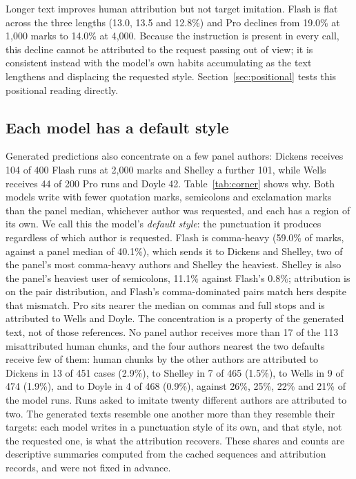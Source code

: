 \documentclass[11pt]{article}
\begin{document}
Longer text improves human attribution but not target imitation.  Flash
is flat across the three lengths (13.0, 13.5 and 12.8\%) and Pro declines
from 19.0\% at 1,000 marks to 14.0\% at 4,000.  Because the instruction
is present in every call, this decline cannot be attributed to the
request passing out of view; it is consistent instead with the model's
own habits accumulating as the text lengthens and displacing the
requested style.  Section~\ref{sec:positional} tests this positional
reading directly.

\subsection{Each model has a default style}

Generated predictions also concentrate on a few panel authors: Dickens
receives 104 of 400 Flash runs at 2,000 marks and Shelley a further 101,
while Wells receives 44 of 200 Pro runs and Doyle 42.
Table~\ref{tab:corner} shows why.  Both models write with fewer
quotation marks, semicolons and exclamation marks than the panel median,
whichever author was requested, and each has a region of its own.  We
call this the model's \emph{default style}: the punctuation it produces
regardless of which author is requested.  
Flash is comma-heavy (59.0\% of marks, against a panel median of
40.1\%), which sends it to Dickens and Shelley, two of the panel's most
comma-heavy authors and Shelley the heaviest.  Shelley is also the
panel's heaviest user of semicolons, 11.1\% against Flash's 0.8\%;
attribution is on the pair distribution, and Flash's comma-dominated
pairs match hers despite that mismatch.  Pro sits nearer the median on
commas and full stops and is attributed to Wells and Doyle.
The concentration is a property of the generated text, not of those
references.  No panel author receives more than 17 of the 113
misattributed human chunks, and the four authors nearest the two
defaults receive few of them: human chunks by the other authors are attributed to Dickens in 13
of 451 cases (2.9\%), to Shelley in 7 of 465 (1.5\%), to Wells in 9 of
474 (1.9\%), and to Doyle in 4 of 468 (0.9\%), against 26\%, 25\%,
22\% and 21\% of the model runs.  Runs asked to imitate twenty
different authors are attributed to two.  The generated texts resemble
one another more than they resemble their targets: each model writes in
a punctuation style of its own, and that style, not the requested one, is
what the attribution recovers.  These shares and counts are descriptive
summaries computed from the cached sequences and attribution records,
and were not fixed in advance.
\end{document}
